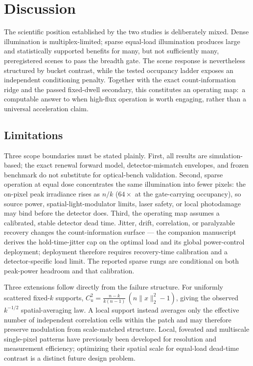 \documentclass[10pt,twocolumn]{article}
\newcommand{\Cu}{C_{u}}
\begin{document}
\FloatBarrier
\section{Discussion}
The scientific position established by the two studies is deliberately
mixed. Dense illumination is multiplex-limited; sparse equal-load
illumination produces large and statistically supported benefits for many,
but not sufficiently many, preregistered scenes to pass the breadth gate.
The scene response is nevertheless structured by bucket contrast, while
the tested occupancy ladder exposes an independent conditioning penalty.
Together with the exact count-information ridge and the passed fixed-dwell
secondary, this constitutes an operating map:\ a computable answer to when
high-flux operation is worth engaging, rather than a universal
acceleration claim.

\subsection{Limitations}
Three scope boundaries must be stated plainly. First, all results are
simulation-based; the exact renewal forward model, detector-mismatch envelopes,
and frozen benchmark do not substitute for optical-bench validation. Second,
sparse operation at equal dose concentrates the same illumination into fewer
pixels: the on-pixel peak irradiance rises as $n/k$ ($64\times$ at the
gate-carrying occupancy), so source power, spatial-light-modulator limits,
laser safety, or local photodamage may bind before the detector does. Third,
the operating map assumes a calibrated, stable detector dead time. Jitter,
drift, correlation, or paralyzable recovery changes the count-information
surface --- the companion manuscript~\cite{companion} derives the
hold-time-jitter cap on the optimal load and its global power-control
deployment; deployment therefore requires recovery-time calibration and a
detector-specific load limit. The reported sparse rungs are conditional on
both peak-power headroom and that calibration.

Three extensions follow directly from the failure structure. For
uniformly scattered fixed-$k$ supports,
$\Cu^{2} = \frac{n-k}{k(n-1)}\,(n\lVert x\rVert_2^{2} - 1)$, giving the
observed $k^{-1/2}$ spatial-averaging law. A local support instead
averages only the effective number of independent correlation cells
within the patch and may therefore preserve modulation from scale-matched
structure. Local, foveated and multiscale single-pixel patterns have
previously been developed for resolution and measurement efficiency;
optimizing their spatial scale for equal-load dead-time contrast is a
distinct future design problem.
\end{document}
